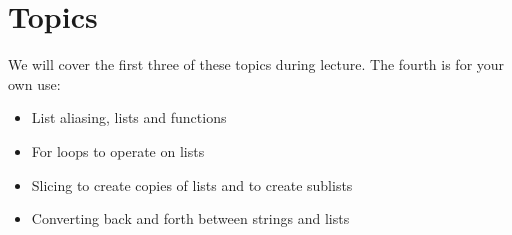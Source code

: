 \documentclass[letterpaper,10pt,english]{sphinxmanual}
\begin{document}
\section{Topics}
\label{\detokenize{lecture_notes/lec10_lists2:topics}}
We will cover the first three of these topics during lecture.  The
fourth is for your own use:
\begin{itemize}
\item {} 
List aliasing, lists and functions

\item {} 
For loops to operate on lists

\item {} 
Slicing to create copies of lists and to create sublists

\item {} 
Converting back and forth between strings and lists

\end{itemize}
\end{document}
